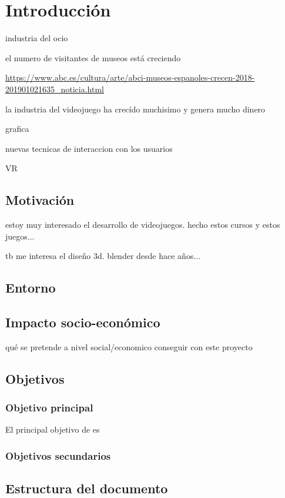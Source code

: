 \chapter{Introducción}
\label{chap:introduccion}

industria del ocio

el numero de visitantes de museos está creciendo

\url{https://www.abc.es/cultura/arte/abci-museos-espanoles-crecen-2018-201901021635_noticia.html}

la industria del videojuego ha crecído muchisimo y genera mucho dinero

grafica

nuevas tecnicas de interaccion con los usuarios

VR


\section{Motivación}

estoy muy interesado el desarrollo de videojuegos. hecho estos cursos y estos juegos...

tb me interesa el diseño 3d. blender desde hace años...

\section{Entorno}

\section{Impacto socio-económico}

qué se pretende a nivel social/economico conseguir con este proyecto

\section{Objetivos}

\subsection{Objetivo principal}

El principal objetivo de \MineRVa es 

\subsection{Objetivos secundarios}

\section{Estructura del documento}